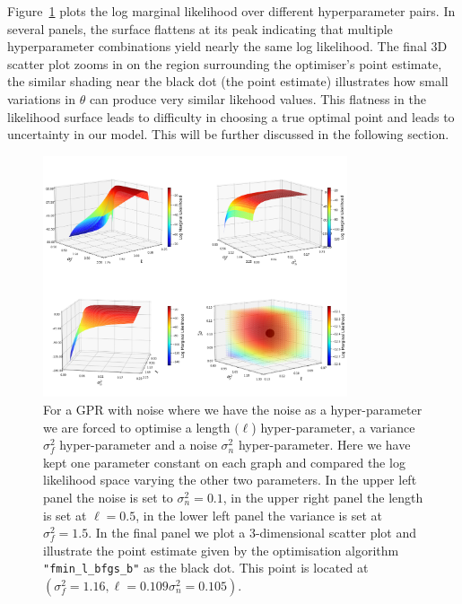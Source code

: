 \documentclass{ucdgradtaughtthesis}
\begin{document}
Figure~\ref{fig:Optimising_Hyperparams} plots the log marginal likelihood over different hyperparameter pairs. In several panels, the surface flattens at its peak indicating that multiple 
hyperparameter combinations yield nearly the same log likelihood.
The final 3D scatter plot zooms in on the region surrounding the optimiser's point estimate,
the similar shading near the black dot (the point estimate) illustrates how small variations in \(\theta\) can produce very similar likehood values. 
This flatness in the likelihood surface leads to difficulty in choosing a true optimal point and leads to uncertainty in our model. 
This will be further discussed in the following section.

\begin{figure}[H]
    \centering
    \includegraphics[width=0.8\textwidth]{LatexPlots/1dplots/LogLikeallparams.png}
    \caption[Visualising the log likelihood optimisation surfaces over the model parameters.]{For a GPR with noise where we have the noise as a hyper-parameter we are forced to optimise a length \((\ell\)) hyper-parameter, a variance \(\sigma_f^2\) hyper-parameter and a noise \(\sigma_n^2\) hyper-parameter. 
    Here we have kept one parameter constant on each graph and compared the log likelihood space varying the other two parameters. 
    In the upper left panel the noise is set to $\sigma^2_n= 0.1$, in the upper right panel the length is set at $ \ell=0.5$, in the lower left panel the variance is set at $\sigma^2_f=1.5$. 
    In the final panel we plot a 3-dimensional scatter plot and illustrate the point estimate given by the optimisation algorithm \texttt{"fmin\_l\_bfgs\_b"} as the black dot. This point is located at
    $(\sigma_f^2 = 1.16, \ell = 0.109 \sigma_n^2 = 0.105)$.}
   \label{fig:Optimising_Hyperparams}
\end{figure} 
\end{document}
